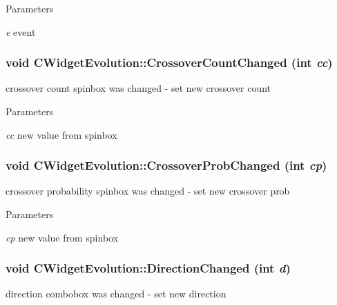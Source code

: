 \begin{DoxyParams}{Parameters}
\item[{\em e}]event \end{DoxyParams}
\hypertarget{classCWidgetEvolution_a813da70b11446896d8b03f2bc7c5eb35}{
\subsubsection[{CrossoverCountChanged}]{\setlength{\rightskip}{0pt plus 5cm}void CWidgetEvolution::CrossoverCountChanged (int {\em cc})}}
\label{classCWidgetEvolution_a813da70b11446896d8b03f2bc7c5eb35}
crossover count spinbox was changed -\/ set new crossover count


\begin{DoxyParams}{Parameters}
\item[{\em cc}]new value from spinbox \end{DoxyParams}
\hypertarget{classCWidgetEvolution_a0cf06a851852dd39ce709869188e6abd}{
\subsubsection[{CrossoverProbChanged}]{\setlength{\rightskip}{0pt plus 5cm}void CWidgetEvolution::CrossoverProbChanged (int {\em cp})}}
\label{classCWidgetEvolution_a0cf06a851852dd39ce709869188e6abd}
crossover probability spinbox was changed -\/ set new crossover prob


\begin{DoxyParams}{Parameters}
\item[{\em cp}]new value from spinbox \end{DoxyParams}
\hypertarget{classCWidgetEvolution_a3c80054e331df0db4a19ba444a82bd53}{
\subsubsection[{DirectionChanged}]{\setlength{\rightskip}{0pt plus 5cm}void CWidgetEvolution::DirectionChanged (int {\em d})}}
\label{classCWidgetEvolution_a3c80054e331df0db4a19ba444a82bd53}
direction combobox was changed -\/ set new direction


